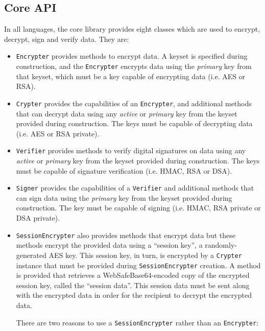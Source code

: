 \documentclass{llncs}
\begin{document}
\subsection{Core API}\label{coreapis}

In all languages, the core library provides eight classes which are
used to encrypt, decrypt, sign and verify data.  They are:

\begin{itemize}

\item {\tt Encrypter} provides methods to encrypt data.  A keyset is
  specified during construction, and the {\tt Encrypter} encrypts data
  using the {\it primary} key from that keyset, which must be a key
  capable of encrypting data (i.e. AES or RSA).

\item {\tt Crypter} provides the capabilities of an {\tt Encrypter},
  and additional methods that can decrypt data using any {\it active}
  or {\it primary} key from the keyset provided during construction.
  The keys must be capable of decrypting data (i.e. AES or RSA private).

\item {\tt Verifier} provides methods to verify digital signatures on
  data using any {\it active} or {\it primary} key from the keyset
  provided during construction.  The keys must be capable of signature
  verification (i.e. HMAC, RSA or DSA).

\item {\tt Signer} provides the capabilities of a {\tt Verifier} and
  additional methods that can sign data using the {\it primary} key
  from the keyset provided during construction.  The key must be
  capable of signing (i.e. HMAC, RSA private or DSA private).

\item {\tt SessionEncrypter} also provides methods that encrypt data
  but these methods encrypt the provided data using a ``session
  key'', a randomly-generated AES key.  This session key, in turn, is
  encrypted by a {\tt Crypter} instance that must be provided during
  {\tt SessionEncrypter} creation.  A method is provided that
  retrieves a WebSafeBase64-encoded copy of the encrypted session
  key, called the ``session data''.  This session data must be sent
  along with the encrypted data in order for the recipient to decrypt
  the encrypted data.

  There are two reasons to use a {\tt SessionEncrypter} rather than an
  {\tt Encrypter}:


\end{itemize}
\end{document}
